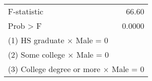 \begin{tabular}{lr}
\toprule
F-statistic &     66.60 \\
Prob > F &    0.0000 \\
\bottomrule
\multicolumn{2}{l}{\footnotesize (1) HS graduate $\times$ Male = 0}\\
\multicolumn{2}{l}{\footnotesize (2) Some college $\times$ Male = 0}\\
\multicolumn{2}{l}{\footnotesize (3) College degree or more $\times$ Male = 0}\\
\end{tabular}
